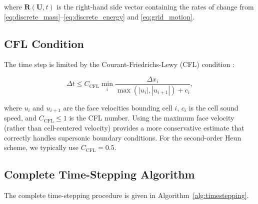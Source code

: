 \documentclass[12pt,a4paper]{article}
\begin{document}
\noindent where $\mathbf{R}(\mathbf{U}, t)$ is the right-hand side vector containing the rates of change from \eqref{eq:discrete_mass}--\eqref{eq:discrete_energy} and \eqref{eq:grid_motion}.

\subsection{CFL Condition}

The time step is limited by the Courant-Friedrichs-Lewy (CFL) condition \citep{Courant1928}:

\begin{equation}
    \Delta t \leq C_{\text{CFL}} \min_i \frac{\Delta x_i}{\max(|u_i|, |u_{i+1}|) + c_i},
    \label{eq:cfl}
\end{equation}

\noindent where $u_i$ and $u_{i+1}$ are the face velocities bounding cell $i$, $c_i$ is the cell sound speed, and $C_{\text{CFL}} \leq 1$ is the CFL number. Using the maximum face velocity (rather than cell-centered velocity) provides a more conservative estimate that correctly handles supersonic boundary conditions. For the second-order Heun scheme, we typically use $C_{\text{CFL}} = 0.5$.

\subsection{Complete Time-Stepping Algorithm}

The complete time-stepping procedure is given in Algorithm~\ref{alg:timestepping}.
\end{document}
